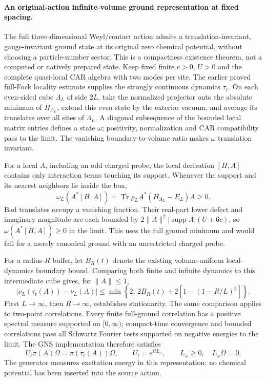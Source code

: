 \paragraph{An original-action infinite-volume ground representation at fixed spacing.}
The full three-dimensional Weyl/contact action admits a
translation-invariant, gauge-invariant ground state at its original
zero chemical potential, without choosing a particle-number sector.
This is a compactness existence theorem, not a computed or natively
prepared state.  Keep fixed finite $c>0$, $U>0$ and the complete
quasi-local CAR algebra with two modes per site.  The earlier proved
full-Fock locality estimate supplies the strongly continuous dynamics
$\tau_t$.  On each even-sided cube $\Lambda_L$ of side $2L$, take the
normalized projector onto the absolute minimum of $H_{\Lambda_L}$,
extend this even state by the exterior vacuum, and average its translates
over all sites of $\Lambda_L$.  A diagonal subsequence of the bounded
local matrix entries defines a state $\omega$; positivity, normalization
and CAR compatibility pass to the limit.  The vanishing
boundary-to-volume ratio makes $\omega$ translation invariant.

For a local $A$, including an odd charged probe, the local derivation
$[H,A]$ contains only interaction terms touching its support.  Whenever
the support and its nearest neighbors lie inside the box,
\[
 \omega_L\!\left(A^*[H,A]\right)
 =\operatorname{Tr}\rho_L A^*(H_{\Lambda_L}-E_L)A\ge0.
\]
Bad translates occupy a vanishing fraction.  Their real-part lower
defect and imaginary magnitude are each bounded by
$2\|A\|^2|\operatorname{supp}A|(U+6c)$, so
$\omega(A^*[H,A])\ge0$ in the limit.  This uses the full ground
minimum and would fail for a merely canonical ground with an
unrestricted charged probe.

For a radius-$R$ buffer, let $B_R(t)$ denote the existing
volume-uniform local-dynamics boundary bound.  Comparing both finite
and infinite dynamics to this intermediate cube gives, for $\|A\|\le1$,
\[
 \bigl|\nu_L(\tau_t(A))-\nu_L(A)\bigr|
 \le \min\!\left\{2,\,2B_R(t)
       +2\left[1-(1-R/L)^3\right]\right\}.
\]
First $L\to\infty$, then $R\to\infty$, establishes stationarity.
The same comparison applies to two-point correlations.  Every finite
full-ground correlation has a positive spectral measure supported on
$[0,\infty)$; compact-time convergence and bounded correlations pass
all Schwartz Fourier tests supported on negative energies to the limit.
The GNS implementation therefore satisfies
\[
 U_t\pi(A)\Omega=\pi(\tau_t(A))\Omega,
 \qquad U_t=e^{itL_\omega},\qquad
 L_\omega\ge0,\quad L_\omega\Omega=0.
\]
The generator measures excitation energy in this representation;
no chemical potential has been inserted into the source action.

